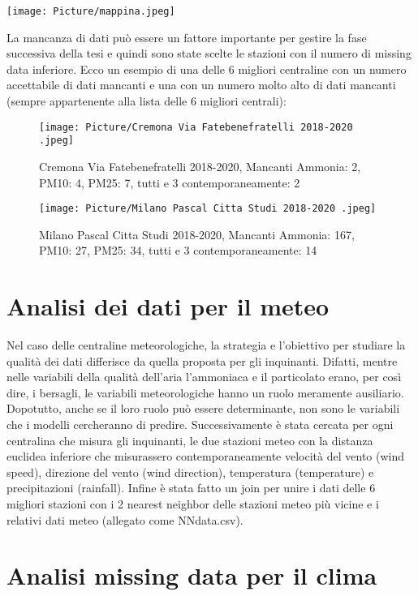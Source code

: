 \documentclass{article}
\begin{document}
\texttt{[image: Picture/mappina.jpeg]}

La mancanza di dati può essere un fattore importante per gestire la fase successiva della tesi
e quindi sono state scelte le stazioni con il numero di missing data inferiore.
Ecco un esempio di una  delle 6 migliori centraline con un numero accettabile di dati mancanti e una con
un numero molto alto di dati mancanti (sempre appartenente alla lista delle 6 migliori centrali):

\begin{figure}[]
    \centering
    \texttt{[image: Picture/Cremona Via Fatebenefratelli 2018-2020 .jpeg]} 
    \caption{Cremona Via Fatebenefratelli 2018-2020, Mancanti Ammonia: 2, PM10: 4, PM25: 7, tutti e 3 contemporaneamente: 2}
    \centering
    \texttt{[image: Picture/Milano Pascal Citta Studi 2018-2020 .jpeg]}
    \caption{Milano Pascal Citta Studi 2018-2020, Mancanti Ammonia: 167, PM10: 27, PM25: 34, tutti e 3 contemporaneamente: 14}
\end{figure}

\section{Analisi dei dati per il meteo}
Nel caso delle centraline meteorologiche, la strategia e l’obiettivo per studiare la qualità dei dati differisce da quella proposta 
per gli inquinanti. 
Difatti, mentre nelle variabili della qualità dell’aria l’ammoniaca e il particolato erano, 
per così dire, i bersagli, le variabili meteorologiche hanno un ruolo meramente ausiliario. 
Dopotutto, anche se il loro ruolo può essere determinante, non sono le variabili che i modelli cercheranno di predire. 
Successivamente è stata cercata per ogni centralina che misura gli inquinanti, le due  
stazioni meteo con la distanza euclidea inferiore che misurassero contemporaneamente velocità del vento (wind speed), 
direzione del vento (wind direction), temperatura (temperature) e precipitazioni (rainfall).
Infine è stata fatto un join per unire i dati delle 6 migliori stazioni con i 2 nearest neighbor delle
stazioni meteo più vicine e i relativi dati meteo (allegato come NNdata.csv). 

\section{Analisi missing data per il clima}
\end{document}
